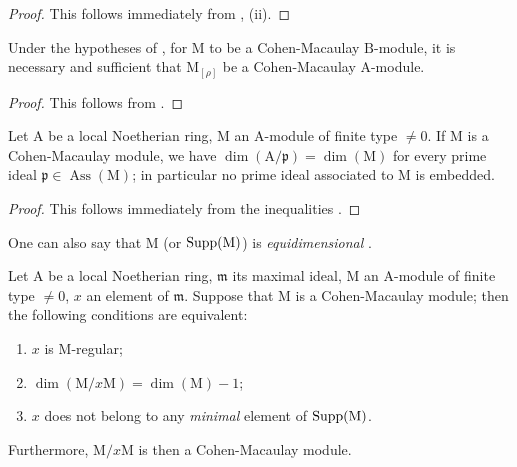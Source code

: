 \begin{proof}
This follows immediately from , (ii).
\end{proof}

\begin{proposition}[16.5.3]
\label{0.16.5.3}
Under the hypotheses of , for $\mathrm{M}$ to be a Cohen-Macaulay $\mathrm{B}$-module, it is necessary and sufficient that $\mathrm{M}_{[\rho]}$ be a Cohen-Macaulay $\mathrm{A}$-module.
\end{proposition}

\begin{proof}
This follows from .
\end{proof}

\begin{proposition}[16.5.4]
\label{0.16.5.4}
Let $\mathrm{A}$ be a local Noetherian ring, $\mathrm{M}$ an $\mathrm{A}$-module of finite type $\neq 0$.
If $\mathrm{M}$ is a Cohen-Macaulay module, we have $\dim(\mathrm{A}/\mathfrak{p})=\dim(\mathrm{M})$ for every prime ideal $\mathfrak{p}\in\operatorname{Ass}(\mathrm{M})$; in particular no prime ideal associated to $\mathrm{M}$ is embedded.
\end{proposition}

\begin{proof}
This follows immediately from the inequalities .
\end{proof}

One can also say that $\mathrm{M}$ (or $\operatorname{Supp}(\mathrm{M})$) is \emph{equidimensional} .


\begin{proposition}[16.5.5]
\label{0.16.5.5}
Let $\mathrm{A}$ be a local Noetherian ring, $\mathfrak{m}$ its maximal ideal, $\mathrm{M}$ an $\mathrm{A}$-module of finite type $\neq 0$, $x$ an element of $\mathfrak{m}$.
Suppose that $\mathrm{M}$ is a Cohen-Macaulay module; then the following conditions are equivalent:
\begin{enumerate}
  \item[a)] $x$ is $\mathrm{M}$-regular;
  \item[b)] $\dim(\mathrm{M}/x\mathrm{M})=\dim(\mathrm{M})-1$;
  \item[c)] $x$ does not belong to any \emph{minimal} element of $\operatorname{Supp}(\mathrm{M})$.
\end{enumerate}
Furthermore, $\mathrm{M}/x\mathrm{M}$ is then a Cohen-Macaulay module.
\end{proposition}

